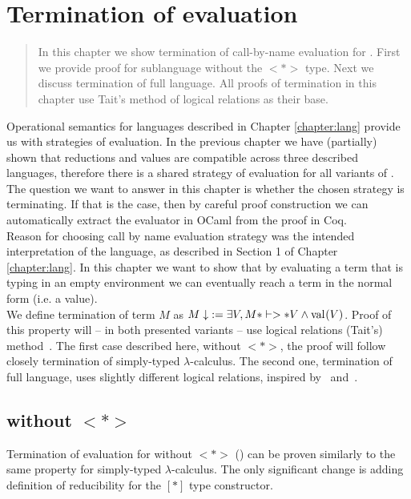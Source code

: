 \chapter{Termination of evaluation} \label{chapter:termin}

\begin{quote}
\small
In this chapter we show termination of call-by-name evaluation for \langLF{}. First we provide proof for sublanguage without the $<*>$ type. Next we discuss termination of full \langLF{} language. All proofs of termination in this chapter use Tait's method of logical relations as their base.
\end{quote}

Operational semantics for languages described in Chapter \ref{chapter:lang} provide us with strategies of evaluation. In the previous chapter we have (partially) shown that reductions and values are compatible across three described languages, therefore there is a shared strategy of evaluation for all variants of \lang{}. The question we want to answer in this chapter is whether the chosen strategy is terminating. If that is the case, then by careful proof construction we can automatically extract the evaluator in OCaml from the proof in Coq.\\

Reason for choosing call by name evaluation strategy was the intended interpretation of the language, as described in Section 1 of Chapter \ref{chapter:lang}.  In this chapter we want to show that by evaluating a term that is typing in an empty environment we can eventually reach a term in the normal form (i.e. a value).\\

 We define termination of term $M$ as $\mbox{${M}\downarrow$} := \exists V, M *|->* V \wedge \mbox{$\mathrm{val}_{}{(V)}$}$. Proof of this property will -- in both presented variants -- use logical relations (Tait's) method~\cite{girard}. The first case described here, \langLF{} without $<*>$, the proof will follow closely termination of simply-typed $\lambda$-calculus. The second one, termination of full \langLF{} language, uses slightly different logical relations, inspired by~\cite{modalnormalization} and~\cite{contextmabi}.\\

\section{\langLF{} without $<*>$}
Termination of evaluation for \langLF{} without $<*>$ (\nodiaLangLF{}) can be proven similarly to the same property for simply-typed $\lambda$-calculus. The only significant change is adding definition of reducibility for the $[*]$ type constructor.

